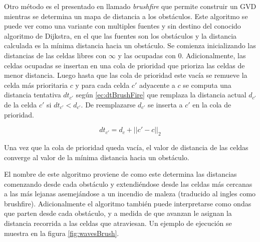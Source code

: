 Otro método es el presentado en \cite{choset2005principles} llamado
\emph{brushfire} que permite construir un GVD mientras se determina un mapa de
distancia a los obstáculos.
Este algoritmo se puede ver como una variante con multiples fuentes y sin
destino del conocido algoritmo de Dijkstra, en el que las fuentes son los
obstáculos y la distancia calculada es la mínima distancia hacia un obstáculo.
Se comienza inicializando las distancias de las celdas libres con $\infty$ y
las ocupadas con $0$.  Adicionalmente, las celdas ocupadas se insertan en una
cola de prioridad que prioriza las celdas de menor distancia. Luego hasta que
las cola de prioridad este vacía se remueve la celda más prioritaria $c$ y para
cada celda $c'$ adyacente a $c$ se computa una distancia tentativa $dt_{c'}$
según \eqref{ec:dtBrushFire} que remplaza la distancia actual $d_{c'}$ de la
celda $c'$ si $dt_{c'}<d_{c'}$. De reemplazarse $d_{c'}$ se inserta a $c'$ en
la cola de prioridad. 

\begin{equation}\label{ec:dtBrushFire}
  dt_{c'} = d_c+||c'-c||_2
\end{equation}

Una vez que la cola de prioridad queda vacía, el valor de distancia de las celdas converge al valor de la mínima distancia hacia un obstáculo. 

El nombre de este algoritmo proviene de como este determina las distancias comenzando desde cada obstáculo y extendiéndose desde las celdas más cercanas a las más lejanas asemejándose a un incendio de maleza (traducido al ingles como brushfire). Adicionalmente el algoritmo también puede interpretarse como ondas que parten desde cada obstáculo, y a medida de que avanzan le asignan la distancia recorrida a las celdas que atraviesan. Un ejemplo de ejecución se muestra en la figura \ref{fig:wavesBrush}.  

